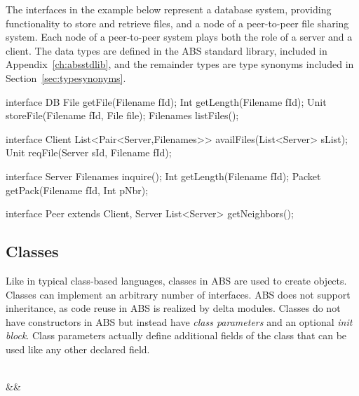 %

The interfaces in the example below represent a database system, providing
functionality to store and retrieve files, and a node of a peer-to-peer file
sharing system. Each node of a peer-to-peer system plays both the role of a
server and a client. The data types are defined in the ABS standard library,
included in Appendix~\ref{ch:absstdlib}, and the remainder types are type synonyms
included in Section~\ref{sec:typesynonyms}.

\begin{absexample}
interface DB {
  File getFile(Filename fId);
  Int getLength(Filename fId);
  Unit storeFile(Filename fId, File file);
  Filenames listFiles();
}

interface Client {
  List<Pair<Server,Filenames>> availFiles(List<Server> sList);
  Unit reqFile(Server sId, Filename fId);
}

interface Server {
  Filenames inquire();
  Int getLength(Filename fId);
  Packet getPack(Filename fId, Int pNbr);
}

interface Peer extends Client, Server {
  List<Server> getNeighbors();
}
\end{absexample}

\subsection{Classes}
Like in typical class-based languages, classes in ABS 
are used to create objects. 
Classes can implement an arbitrary number of interfaces.
ABS does not support inheritance, as code reuse in ABS is realized by delta modules.
Classes do not have constructors in ABS but instead have
\emph{class parameters} and an optional \emph{init block}.
Class parameters actually define additional fields of the 
class that can be used like any other declared field.
\newpage

\begin{abssyntax}
      {}\ \ \  
\\&&
                  \TRS{\{}\ \ \ \ \TRS{\}}\\  
  {}\ \\
      {}\ \ \ \TRS{;}\\
   {}\ \\
       {}\ \ \TRS{(}  \TRS{)}\ 
\end{abssyntax}

